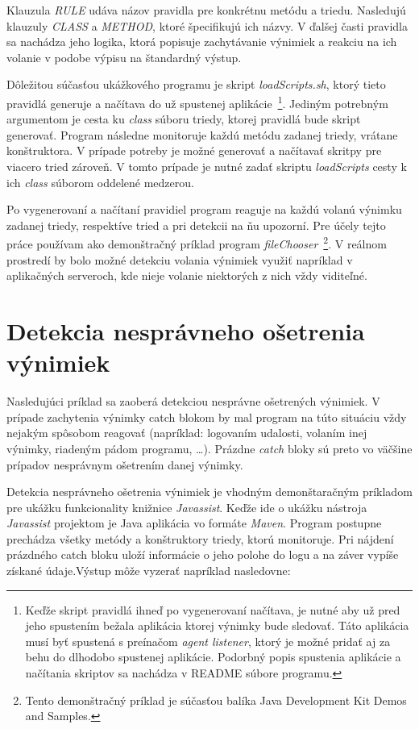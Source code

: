 \documentclass[11pt,final,oneside]{fithesis}
\begin{document}
Klauzula \textit{RULE} udáva názov pravidla pre konkrétnu metódu a triedu. Nasledujú klauzuly \textit{CLASS} a \textit{METHOD}, ktoré špecifikujú ich názvy. V ďalšej časti pravidla sa nachádza jeho logika, ktorá popisuje zachytávanie výnimiek a reakciu na ich volanie v podobe výpisu na štandardný výstup.

Dôležitou súčasťou ukážkového programu je skript \textit{loadScripts.sh}, ktorý tieto pravidlá generuje a načítava do už spustenej aplikácie~\footnote{Keďže skript pravidlá ihneď po vygenerovaní načítava, je nutné aby už pred jeho spustením bežala aplikácia ktorej výnimky bude sledovať. Táto aplikácia musí byť spustená s preínačom \textit{agent listener}, ktorý je možné pridať aj za behu do dlhodobo spustenej aplikácie. Podorbný popis spustenia aplikácie a načítania skriptov sa nachádza v README súbore programu.}. Jediným potrebným argumentom je cesta ku \textit{class} súboru triedy, ktorej pravidlá bude skript generovať. Program následne monitoruje každú metódu zadanej triedy, vrátane konštruktora. V prípade potreby je možné generovať a načítavať skritpy pre viacero tried zároveň. V tomto prípade je nutné zadať skriptu \textit{loadScripts} cesty k ich \textit{class} súborom oddelené medzerou.

Po vygenerovaní a načítaní pravidiel program reaguje na každú volanú výnimku zadanej triedy, respektíve tried a pri detekcii na ňu upozorní. Pre účely tejto práce používam ako demonštračný príklad program \textit{fileChooser}~\footnote{Tento demonštračný príklad je súčasťou balíka Java Development Kit Demos and Samples.}. V reálnom prostredí by bolo možné detekciu volania výnimiek využiť napríklad v aplikačných serveroch, kde nieje volanie niektorých z nich vždy viditeľné.

\section{Detekcia nesprávneho ošetrenia výnimiek}
Nasledujúci príklad sa zaoberá detekciou nesprávne ošetrených výnimiek. V prípade zachytenia výnimky catch blokom by mal program na túto situáciu vždy nejakým spôsobom reagovať (napríklad: logovaním udalosti, volaním inej výnimky, riadeným pádom programu, …). Prázdne \textit{catch} bloky sú preto vo väčšine prípadov nesprávnym ošetrením danej výnimky.

Detekcia nesprávneho ošetrenia výnimiek je vhodným demonštaračným príkladom pre ukážku funkcionality knižnice \textit{Javassist}. Keďže ide o ukážku nástroja \textit{Javassist} projektom je Java aplikácia vo formáte \textit{Maven}. Program postupne prechádza všetky metódy a konštruktory triedy, ktorú monitoruje. Pri nájdení prázdného catch bloku uloží informácie o jeho polohe do logu a na záver vypíše získané údaje.Výstup môže vyzerať napríklad nasledovne:
\end{document}
